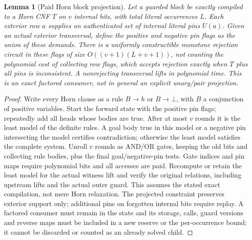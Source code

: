 \documentclass[11pt]{article}
\newtheorem{lemma}[theorem]{Lemma}
\begin{document}
\begin{lemma}[Paid Horn block projection]\label{lem:dr19-horn}
Let a guarded block be exactly compiled to a Horn CNF $T$ on $v$ internal bits, with total literal occurrences $L$. Each exterior row $a$ supplies an authenticated set of internal literal pins $U(a)$. Given an actual exterior transversal, define the positive and negative pin flags as the union of these demands. There is a uniformly constructible monotone rejection circuit in these flags of size $O((v+1)(L+v+1))$, not counting the polynomial cost of collecting row flags, which accepts rejection exactly when $T$ plus all pins is inconsistent. A nonrejecting transversal lifts in polynomial time. This is an exact factored consumer, not in general an explicit unary/pair projection.
\end{lemma}
\begin{proof}
Write every Horn clause as a rule $B\to h$ or $B\to\bot$, with $B$ a conjunction of positive variables. Start the forward state with the positive pin flags; repeatedly add all heads whose bodies are true. After at most $v$ rounds it is the least model of the definite rules. A goal body true in this model or a negative pin intersecting the model certifies contradiction; otherwise the least model satisfies the complete system. Unroll $v$ rounds as AND/OR gates, keeping the old bits and collecting rule bodies, plus the final goal/negative-pin tests. Gate indices and pin maps require polynomial bits and all accesses are paid. Recompute or retain the least model for the actual witness lift and verify the original relations, including upstream lifts and the actual outer guard. This assumes the stated exact compilation, not mere Horn relaxation. The projected constraint preserves exterior support only; additional pins on forgotten internal bits require replay. A factored consumer must remain in the state and its storage, calls, guard versions and reverse maps must be included in a new reserve or the per-occurrence bound; it cannot be discarded or counted as an already solved child.
\end{proof}
\end{document}
